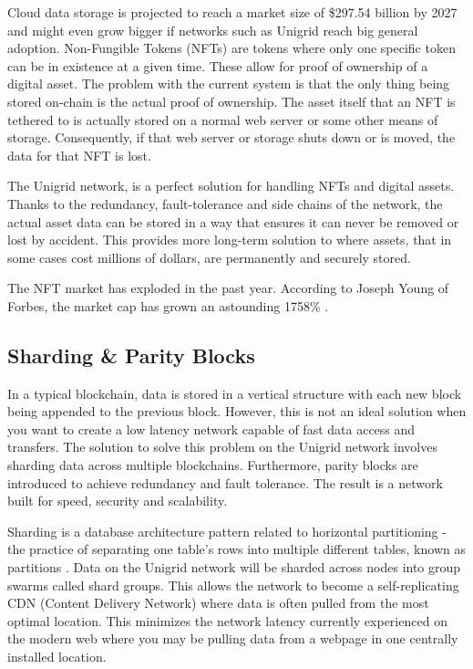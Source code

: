 \documentclass{article}
\begin{document}
Cloud data storage is projected to reach a market size of \$297.54 billion by 2027 \cite{fort2021} and might even grow bigger if networks such as Unigrid reach big general adoption. Non-Fungible Tokens (NFTs) are tokens where only one specific token can be in existence at a given time. These allow for proof of ownership of a digital asset. The problem with the current system is that the only thing being stored on-chain is the actual proof of ownership. The asset itself that an NFT is tethered to is actually stored on a normal web server or some other means of storage. Consequently, if that web server or storage shuts down or is moved, the data for that NFT is lost.

The Unigrid network, is a perfect solution for handling NFTs and digital assets. Thanks to the redundancy, fault-tolerance and side chains of the network, the actual asset data can be stored in a way that ensures it can never be removed or lost by accident. This provides more long-term solution to where assets, that in some cases cost millions of dollars, are permanently and securely stored.

The NFT market has exploded in the past year. According to Joseph Young of Forbes, the market cap has grown an astounding 1758\% \cite{young2021}.

\subsection{Sharding \& Parity Blocks}
In a typical blockchain, data is stored in a vertical structure with each new block being appended to the previous block. However, this is not an ideal solution when you want to create a low latency network capable of fast data access and transfers. The solution to solve this problem on the Unigrid network involves sharding data across multiple blockchains. Furthermore, parity blocks are introduced to achieve redundancy and fault tolerance. The result is a network built for speed, security and scalability.

Sharding is a database architecture pattern related to horizontal partitioning - the practice of separating one table’s rows into multiple different tables, known as partitions \cite{mark2019}. Data on the Unigrid network will be sharded across nodes into group swarms called shard groups. This allows the network to become a self-replicating CDN (Content Delivery Network) where data is often pulled from the most optimal location. This minimizes the network latency currently experienced on the modern web where you may be pulling data from a webpage in one centrally installed location.
\end{document}
